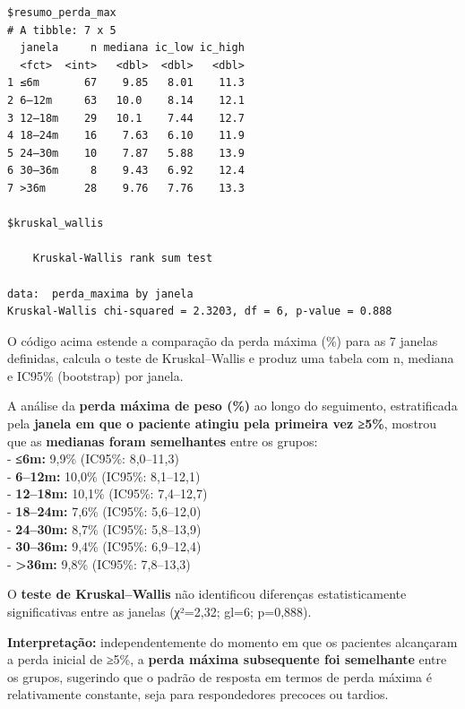 \documentclass[
]{article}
\begin{document}
\begin{verbatim}
$resumo_perda_max
# A tibble: 7 x 5
  janela     n mediana ic_low ic_high
  <fct>  <int>   <dbl>  <dbl>   <dbl>
1 ≤6m       67    9.85   8.01    11.3
2 6–12m     63   10.0    8.14    12.1
3 12–18m    29   10.1    7.44    12.7
4 18–24m    16    7.63   6.10    11.9
5 24–30m    10    7.87   5.88    13.9
6 30–36m     8    9.43   6.92    12.4
7 >36m      28    9.76   7.76    13.3

$kruskal_wallis

    Kruskal-Wallis rank sum test

data:  perda_maxima by janela
Kruskal-Wallis chi-squared = 2.3203, df = 6, p-value = 0.888
\end{verbatim}

O código acima estende a comparação da perda máxima (\%) para as 7
janelas definidas, calcula o teste de Kruskal--Wallis e produz uma
tabela com n, mediana e IC95\% (bootstrap) por janela.

A análise da \textbf{perda máxima de peso (\%)} ao longo do seguimento,
estratificada pela \textbf{janela em que o paciente atingiu pela
primeira vez ≥5\%}, mostrou que as \textbf{medianas foram semelhantes}
entre os grupos:\\
- \textbf{≤6m:} 9,9\% (IC95\%: 8,0--11,3)\\
- \textbf{6--12m:} 10,0\% (IC95\%: 8,1--12,1)\\
- \textbf{12--18m:} 10,1\% (IC95\%: 7,4--12,7)\\
- \textbf{18--24m:} 7,6\% (IC95\%: 5,6--12,0)\\
- \textbf{24--30m:} 8,7\% (IC95\%: 5,8--13,9)\\
- \textbf{30--36m:} 9,4\% (IC95\%: 6,9--12,4)\\
- \textbf{\textgreater36m:} 9,8\% (IC95\%: 7,8--13,3)

O \textbf{teste de Kruskal--Wallis} não identificou diferenças
estatisticamente significativas entre as janelas (χ²=2,32; gl=6;
p=0,888).

\textbf{Interpretação:} independentemente do momento em que os pacientes
alcançaram a perda inicial de ≥5\%, a \textbf{perda máxima subsequente
foi semelhante} entre os grupos, sugerindo que o padrão de resposta em
termos de perda máxima é relativamente constante, seja para
respondedores precoces ou tardios.
\end{document}
